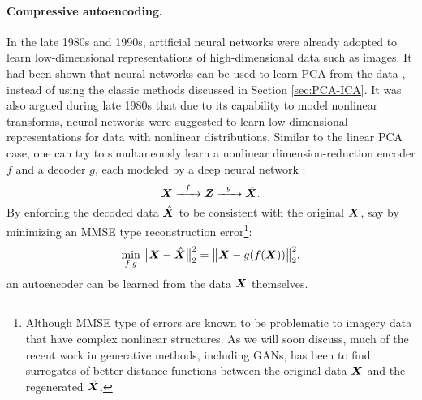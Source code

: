 \documentclass[\toplevelprefix/book-main.tex]{subfiles}
\begin{document}
\paragraph{Compressive autoencoding.}
In the late 1980s and 1990s, artificial neural networks were already adopted to learn low-dimensional representations of high-dimensional data such as images. It had been shown that neural networks can be used to learn PCA from the data \cite{Oja1982SimplifiedNM,Baldi89}, instead of using the classic methods discussed in Section \ref{sec:PCA-ICA}. It was also argued during late 1980s that due to its capability to model nonlinear transforms, neural networks were suggested to learn low-dimensional representations for data with nonlinear distributions. Similar to the linear PCA case, one can try to simultaneously learn a nonlinear dimension-reduction encoder $f$ and a decoder $g$, each modeled by a deep neural network  \cite{Rumelhart1986,Kramer1991NonlinearPC}:
\begin{equation}
    \bm{X}   \xrightarrow{\hspace{2mm} f \hspace{2mm}} \bm{Z}  \xrightarrow{\hspace{2mm} g \hspace{2mm}} \hat {\bm{X}}.
       \label{eqn:auto-encoding-deep-networks}
\end{equation}
By enforcing the decoded data $\hat {\bm{X}}$ to be consistent with the original $\bm{X}$, say by minimizing an MMSE type reconstruction error\footnote{Although MMSE type of errors are known to be problematic to imagery data that have complex nonlinear structures. As we will soon discuss, much of the recent work in generative methods, including GANs, has been to find surrogates of better distance functions between the original data $\bm{X}$ and the regenerated $\hat {\bm{X}}$.}:
\begin{equation}
    \min_{f,g} \big\|\bm{X} - \hat {\bm{X}}\big\|_2^2 = \big\|\bm{X} - g(f( \bm{X}))\big\|_2^2,
\end{equation}
an autoencoder can be learned from the data $\bm{X}$ themselves. 
\end{document}
